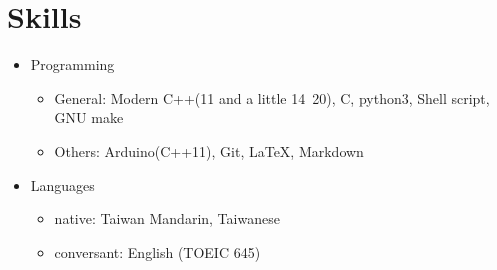 \section{Skills}
\begin{itemize}
	\item Programming
	\begin{itemize}
		\item General: Modern C++(11 and a little 14~20), C, python3, Shell script, GNU make
		\item Others: Arduino(C++11), Git, \LaTeX , Markdown
	\end{itemize}
	\item Languages
	\begin{itemize}
		\item native: Taiwan Mandarin, Taiwanese
		\item conversant: English (TOEIC 645)
	\end{itemize}
\end{itemize}